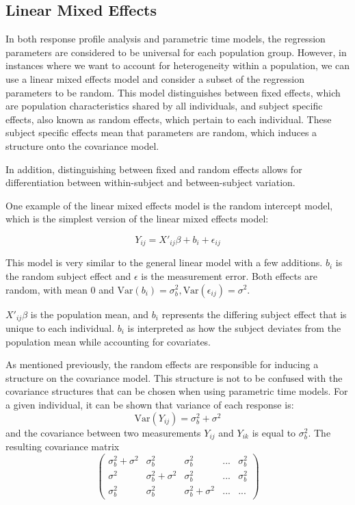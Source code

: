 \documentclass[12pt, twoside]{amherstthesis}
\begin{document}
\hypertarget{linear-mixed-effects}{%
\subsection{Linear Mixed Effects}\label{linear-mixed-effects}}

In both response profile analysis and parametric time models, the regression parameters are considered to be universal for each population group. However, in instances where we want to account for heterogeneity within a population, we can use a linear mixed effects model and consider a subset of the regression parameters to be random. This model distinguishes between fixed effects, which are population characteristics shared by all individuals, and subject specific effects, also known as random effects, which pertain to each individual. These subject specific effects mean that parameters are random, which induces a structure onto the covariance model.

In addition, distinguishing between fixed and random effects allows for differentiation between within-subject and between-subject variation.

One example of the linear mixed effects model is the random intercept model, which is the simplest version of the linear mixed effects model:

\[Y_{ij} = X'_{ij}\beta + b_i + \epsilon_{ij}\]

This model is very similar to the general linear model with a few additions. \(b_i\) is the random subject effect and \(\epsilon\) is the measurement error. Both effects are random, with mean 0 and \(\text{Var}(b_i) = \sigma^2_b, \text{Var}(\epsilon_{ij})=\sigma^2\).

\(X'_{ij}\beta\) is the population mean, and \(b_i\) represents the differing subject effect that is unique to each individual. \(b_i\) is interpreted as how the subject deviates from the population mean while accounting for covariates.

As mentioned previously, the random effects are responsible for inducing a structure on the covariance model. This structure is not to be confused with the covariance structures that can be chosen when using parametric time models. For a given individual, it can be shown that variance of each response is:
\[\text{Var}(Y_{ij}) = \sigma^2_b + \sigma^2\] and the covariance between two measurements \(Y_{ij}\) and \(Y_{ik}\) is equal to \(\sigma^2_b\). The resulting covariance matrix \[\begin{pmatrix} \sigma^2_b + \sigma^2 & \sigma^2_b & \sigma^2_b & ... & \sigma^2_b \\ \sigma^2 & \sigma^2_b + \sigma^2 & \sigma^2_b & ... & \sigma^2_b \\ \sigma^2_b & \sigma^2_b & \sigma^2_b + \sigma^2 & ...& ...   \end{pmatrix}\]
\end{document}
